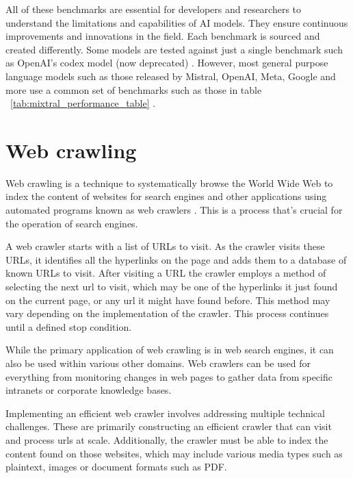 


All of these benchmarks are essential for developers and researchers to understand the limitations and capabilities of AI models. They ensure continuous improvements and innovations in the field. Each benchmark is sourced and created differently. Some models are tested against just a single benchmark such as OpenAI’s codex model (now deprecated) \cite{chen_evaluating_2021}. However, most general purpose language models such as those released by Mistral, OpenAI, Meta, Google and more use a common set of benchmarks such as those in table ~\ref{tab:mixtral_performance_table} \cite{jiang_mixtral_2024, meta_ai_introducing_2024, touvron_llama_2023-1, gemini_team_gemini_2024}.


\section{Web crawling}


Web crawling is a technique to systematically browse the World Wide Web to index the content of websites for search engines and other applications using automated programs known as web crawlers \cite{pant_crawling_2003, liu_web_2009}. This is a process that’s crucial for the operation of search engines.


A web crawler starts with a list of URLs to visit. As the crawler visits these URLs, it identifies all the hyperlinks on the page and adds them to a database of known URLs to visit. After visiting a URL the crawler employs a method of selecting the next url to visit, which may be one of the hyperlinks it just found on the current page, or any url it might have found before. This method may vary depending on the implementation of the crawler. This process continues until a defined stop condition.


While the primary application of web crawling is in web search engines, it can also be used within various other domains. Web crawlers can be used for everything from monitoring changes in web pages to gather data from specific intranets or corporate knowledge bases.


Implementing an efficient web crawler involves addressing multiple technical challenges. These are primarily constructing an efficient crawler that can visit and process urls at scale. Additionally, the crawler must be able to index the content found on those websites, which may include various media types such as plaintext, images or document formats such as PDF.






